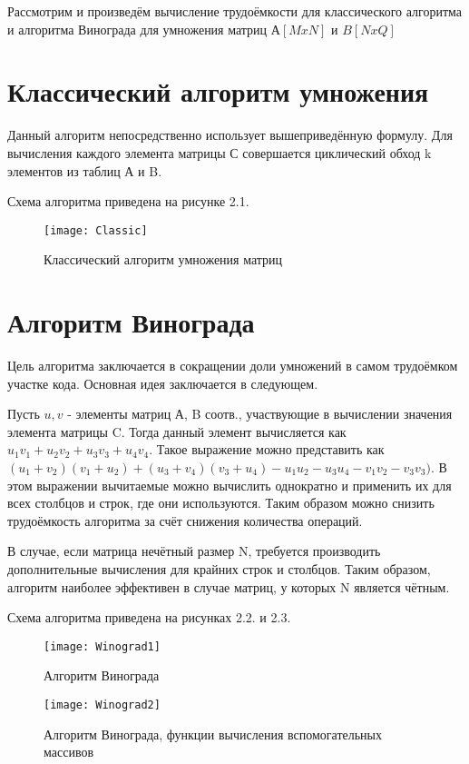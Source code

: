Рассмотрим и произведём вычисление трудоёмкости для классического алгоритма и алгоритма Винограда для умножения матриц $ А[MxN] $ и $ B[NxQ] $

\section{Классический алгоритм умножения}
Данный алгоритм непосредственно использует вышеприведённую формулу. Для вычисления каждого элемента матрицы С 
совершается циклический обход k элементов из таблиц А и B.

Схема алгоритма приведена на рисунке 2.1.
\begin{figure}[h]
	\begin{center}
		{\texttt{[image: Classic]}}
		\caption{Классический алгоритм умножения матриц}
	\end{center}
\end{figure}

\section{Алгоритм Винограда}
Цель алгоритма заключается в сокращении доли умножений в самом трудоёмком участке кода. Основная идея заключается в следующем. 

Пусть $ u, v $ - элементы матриц А, B соотв., участвующие в вычислении значения элемента матрицы C. Тогда данный элемент вычисляется как 
$ u_{1}v_{1} + u_{2}v_{2} + u_{3}v_{3} + u_{4}v_{4}$.
Такое выражение можно представить как 
$ (u_{1} + v_{2})(v_{1} + u_{2}) + (u_{3} + v_{4})(v_{3} + u_{4}) - u_{1}u_{2} - u_{3}u_{4} - v_{1}v_{2} - v_{3}v_{3})$. В этом выражении вычитаемые можно вычислить однократно и применить их для всех столбцов и строк, где они используются. Таким образом можно снизить трудоёмкость алгоритма за счёт снижения количества операций.

В случае, если матрица нечётный размер N, требуется производить дополнительные вычисления для крайних строк и столбцов. Таким образом, алгоритм наиболее эффективен в случае матриц, у которых N является чётным.

Схема алгоритма приведена на рисунках 2.2. и 2.3.
\begin{figure}[h]
	\begin{center}
		{\texttt{[image: Winograd1]}}
		\caption{Алгоритм Винограда}
	\end{center}
\end{figure}
\begin{figure}[h]
	\begin{center}
		{\texttt{[image: Winograd2]}}
		\caption{Алгоритм Винограда, функции вычисления вспомогательных массивов}
	\end{center}
\end{figure}



